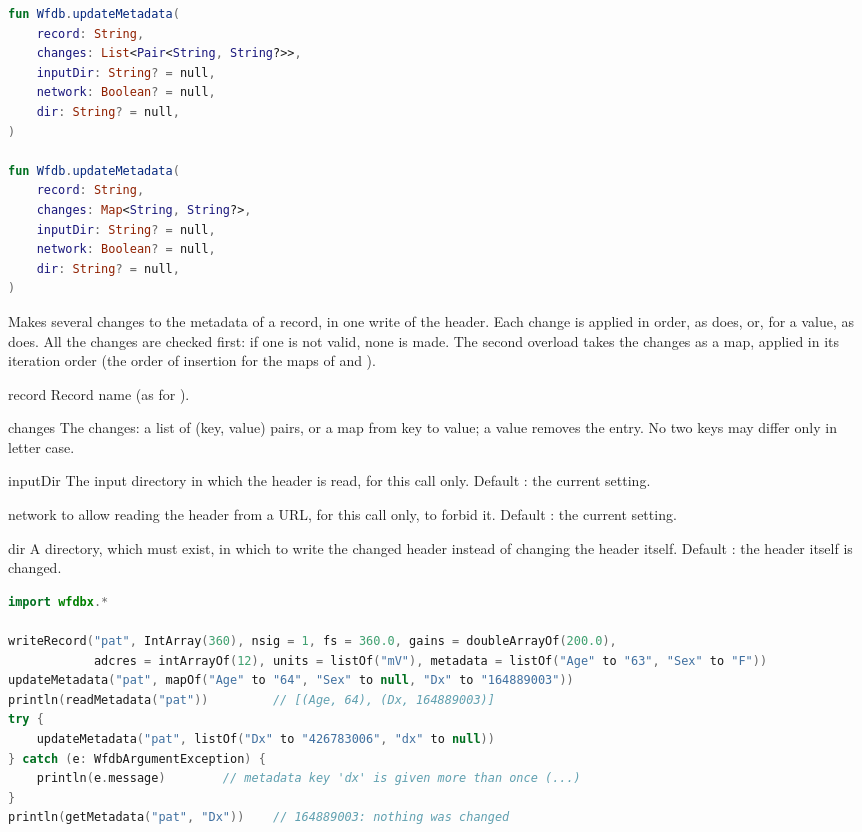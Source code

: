 \begin{lstlisting}[language=Kotlin,style=signature]
fun Wfdb.updateMetadata(
    record: String,
    changes: List<Pair<String, String?>>,
    inputDir: String? = null,
    network: Boolean? = null,
    dir: String? = null,
)

fun Wfdb.updateMetadata(
    record: String,
    changes: Map<String, String?>,
    inputDir: String? = null,
    network: Boolean? = null,
    dir: String? = null,
)
\end{lstlisting}
Makes several changes to the metadata of a record, in one write of the header. Each
change is applied in order, as  does, or, for a  value, as
 does. All the changes are checked first: if one is not valid, none
is made. The second overload takes the changes as a map, applied in its iteration order
(the order of insertion for the maps of  and ).
\begin{params}
\item[record] Record name (as for ).
\item[changes] The changes: a list of (key, value) pairs, or a map from key to value; a
   value removes the entry. No two keys may differ only in letter case.
\item[inputDir] The input directory in which the header is read, for this call only.
  Default : the current setting.
\item[network]  to allow reading the header from a URL, for this call only,
   to forbid it. Default : the current setting.
\item[dir] A directory, which must exist, in which to write the changed header instead of
  changing the header itself. Default : the header itself is changed.
\end{params}
\begin{lstlisting}[language=Kotlin,style=example]
import wfdbx.*

writeRecord("pat", IntArray(360), nsig = 1, fs = 360.0, gains = doubleArrayOf(200.0),
            adcres = intArrayOf(12), units = listOf("mV"), metadata = listOf("Age" to "63", "Sex" to "F"))
updateMetadata("pat", mapOf("Age" to "64", "Sex" to null, "Dx" to "164889003"))
println(readMetadata("pat"))         // [(Age, 64), (Dx, 164889003)]
try {
    updateMetadata("pat", listOf("Dx" to "426783006", "dx" to null))
} catch (e: WfdbArgumentException) {
    println(e.message)        // metadata key 'dx' is given more than once (...)
}
println(getMetadata("pat", "Dx"))    // 164889003: nothing was changed
\end{lstlisting}

